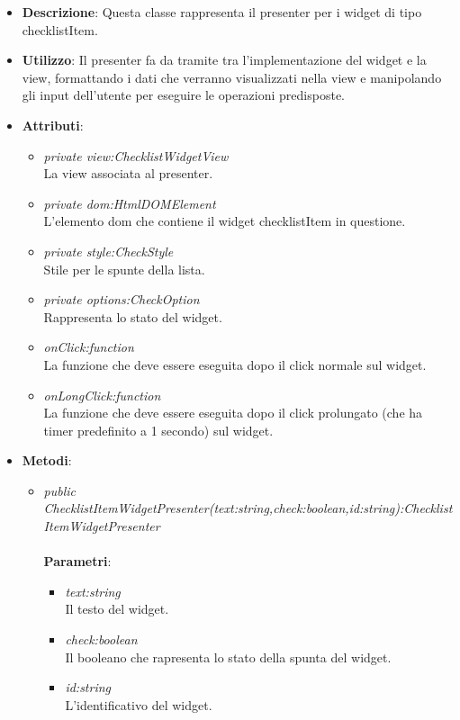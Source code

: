 \begin{itemize}
\item \textbf{Descrizione}: Questa classe rappresenta il presenter per i widget di tipo checklistItem.
\item \textbf{Utilizzo}: Il presenter fa da tramite tra l'implementazione del widget e la view, formattando i dati che verranno visualizzati nella view e manipolando gli input dell'utente per eseguire le operazioni predisposte.
\item \textbf{Attributi}:
	\begin{itemize}
	\item \textit{private view:ChecklistWidgetView}\\
	La view associata al presenter.
	\item \textit{private dom:HtmlDOMElement}\\
	L'elemento dom che contiene il widget checklistItem in questione.
	\item \textit{private style:CheckStyle}\\
	Stile per le spunte della lista.
	\item \textit{private options:CheckOption}\\
	Rappresenta lo stato del widget.
	\item \textit{onClick:function}\\
	La funzione che deve essere eseguita dopo il click normale sul widget.
	\item \textit{onLongClick:function}\\
	La funzione che deve essere eseguita dopo il click prolungato (che ha timer predefinito a 1 secondo) sul widget.
	\end{itemize}
\item \textbf{Metodi}:
	\begin{itemize}
	\item \textit{public ChecklistItemWidgetPresenter(text:string,check:boolean,id:string):ChecklistItemWidgetPresenter}\\
		\\ \textbf{Parametri}: \begin{itemize}
		\item \textit{text:string}\\
		Il testo del widget.
		\item \textit{check:boolean}\\
		Il booleano che rapresenta lo stato della spunta del widget.
		\item \textit{id:string}\\
		L'identificativo del widget.

\end{itemize}
\end{itemize}
\end{itemize}
